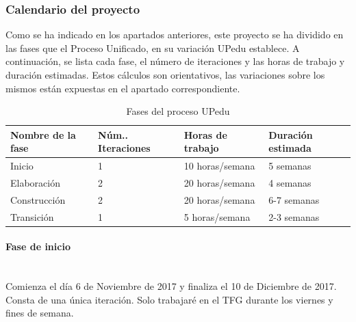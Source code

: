 \documentclass[twoside]{report}
\begin{document}
\subsubsection{Calendario del proyecto}

Como se ha indicado en los apartados anteriores, este proyecto se ha dividido en las fases que el Proceso Unificado, en su variación UPedu\cite{upedu} establece. A continuación, se lista cada fase, el número de iteraciones y las horas de trabajo y duración estimadas. Estos cálculos son orientativos, las variaciones sobre los mismos están expuestas en el apartado correspondiente.

\begin{table}[H]
\centering
\begin{tabular}{|l|l|l|l|}
\hline
Nombre de la fase & Núm.. Iteraciones & Horas de trabajo & Duración estimada \\ \hline
Inicio            & 1                 & 10 horas/semana  & 5 semanas       \\ \hline
Elaboración       & 2                 & 20 horas/semana  & 4 semanas     \\ \hline
Construcción      & 2                 & 20 horas/semana  & 6-7 semanas       \\ \hline
Transición        & 1                 & 5 horas/semana   & 2-3 semanas       \\ \hline
\end{tabular}
\caption{Fases del proceso UPedu}
\end{table}

\paragraph{Fase de inicio}\mbox{}\\

Comienza el día 6 de Noviembre de 2017 y finaliza el 10 de Diciembre de 2017. Consta de una única iteración. Solo trabajaré en el TFG durante los viernes y fines de semana.
\end{document}

